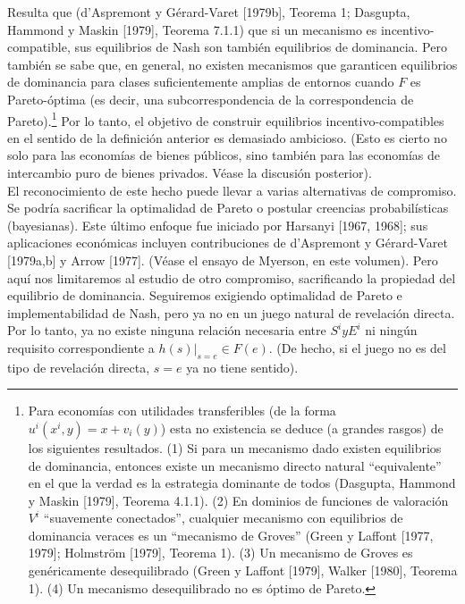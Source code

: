 \documentclass[12pt, letterpaper]{article}
\begin{document}
Resulta que (d'Aspremont y Gérard-Varet [1979b], Teorema 1; Dasgupta, Hammond y Maskin [1979], Teorema 7.1.1) que si un mecanismo es incentivo-compatible, sus equilibrios de Nash son también equilibrios de dominancia. Pero también se sabe que, en general, no existen mecanismos que garanticen equilibrios de dominancia para clases suficientemente amplias de entornos cuando $F$ es Pareto-óptima (es decir, una subcorrespondencia de la correspondencia de Pareto).\footnote{Para economías con utilidades transferibles (de la forma $u^i(x^i, y) = x + v_i(y)$) esta no existencia se deduce (a grandes rasgos) de los siguientes resultados. (1) Si para un mecanismo dado existen equilibrios de dominancia, entonces existe un mecanismo directo natural ``equivalente'' en el que la verdad es la estrategia dominante de todos (Dasgupta, Hammond y Maskin [1979], Teorema 4.1.1). (2) En dominios de funciones de valoración $V^i$ ``suavemente conectados'', cualquier mecanismo con equilibrios de dominancia veraces es un ``mecanismo de Groves'' (Green y Laffont [1977, 1979]; Holmström [1979], Teorema 1). (3) Un mecanismo de Groves es genéricamente desequilibrado (Green y Laffont [1979], Walker [1980], Teorema 1). (4) Un mecanismo desequilibrado no es óptimo de Pareto.} Por lo tanto, el objetivo de construir equilibrios incentivo-compatibles en el sentido de la definición anterior es demasiado ambicioso. (Esto es cierto no solo para las economías de bienes públicos, sino también para las economías de intercambio puro de bienes privados. Véase la discusión posterior). \\

El reconocimiento de este hecho puede llevar a varias alternativas de compromiso. Se podría sacrificar la optimalidad de Pareto o postular creencias probabilísticas (bayesianas). Este último enfoque fue iniciado por Harsanyi [1967, 1968]; sus aplicaciones económicas incluyen contribuciones de d'Aspremont y Gérard-Varet [1979a,b] y Arrow [1977]. (Véase el ensayo de Myerson, en este volumen). Pero aquí nos limitaremos al estudio de otro compromiso, sacrificando la propiedad del equilibrio de dominancia. Seguiremos exigiendo optimalidad de Pareto e implementabilidad de Nash, pero ya no en un juego natural de revelación directa. Por lo tanto, ya no existe ninguna relación necesaria entre $S^{i} y E^{i}$ ni ningún requisito correspondiente a $h(s)|_{s=e} \in F(e)$. (De hecho, si el juego no es del tipo de revelación directa, $s = e$ ya no tiene sentido). \\
\end{document}
